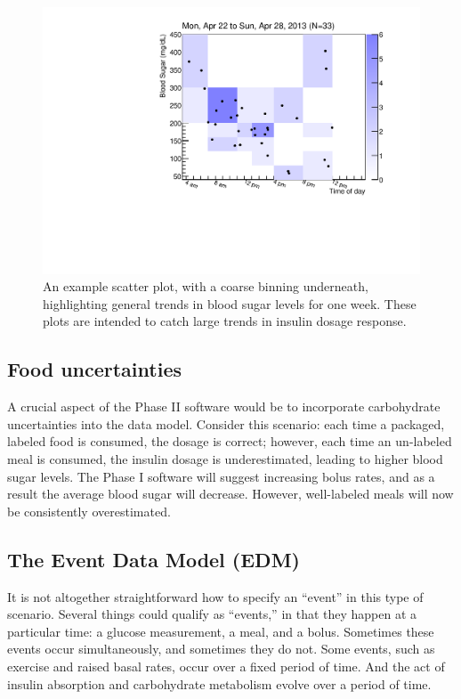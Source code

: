 \begin{figure}[htbp]
\begin{center}
\includegraphics[width=4.5in]{figures/example_weekly.pdf}
\caption{An example scatter plot, with a coarse binning underneath, highlighting general trends in
blood sugar levels for one week. These plots are intended to catch large trends in insulin dosage
response.}
\label{default}
\end{center}
\end{figure}

\subsection{Food uncertainties}

A crucial aspect of the Phase II software would be to incorporate carbohydrate  uncertainties into the 
data model. Consider this scenario: each time a packaged, labeled food is consumed, the dosage is 
correct; however, each time an un-labeled meal is consumed, the insulin dosage is underestimated, 
leading to higher blood sugar levels. The Phase I software will suggest increasing bolus rates, and 
as a result the average blood sugar will decrease. However, well-labeled meals will now be 
consistently overestimated.

\subsection{The Event Data Model (EDM)}

It is not altogether straightforward how to specify an ``event'' in this type of scenario. Several 
things could qualify as ``events,'' in that they happen at a particular time: a glucose measurement, 
a meal, and a bolus. Sometimes these events occur simultaneously, and sometimes they do not. Some 
events, such as exercise and raised basal rates, occur over a fixed period of time. And the act of 
insulin absorption and carbohydrate metabolism evolve over a period of time.

